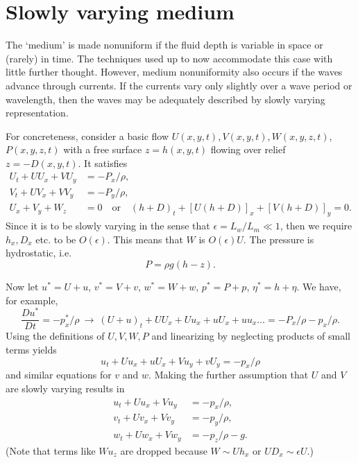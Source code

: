 \section{Slowly varying medium}

The `medium' is made nonuniform if the fluid depth is variable in space or (rarely) in
time. The techniques used up to now accommodate this case with little further thought.
However, medium nonuniformity also occurs if the waves advance through currents. If
the currents vary only slightly over a wave period or wavelength, then the waves may be
adequately described by slowly varying representation.

\sourcepagebreak

For concreteness, consider a basic flow $U(x,y,t),V(x,y,t),W(x,y,z,t)$,
$P(x,y,z,t)$ with a free surface $z=h(x,y,t)$ flowing over relief $z=-D(x,y,t)$. It
satisfies
\begin{align*}
	U_t+UU_x+VU_y & =-P_x/\rho, \\
	V_t+UV_x+VV_y & =-P_y/\rho, \\
	U_x+V_y+W_z   & =0
	\quad\text{or}\quad
	(h+D)_t+[U(h+D)]_x+[V(h+D)]_y=0.
\end{align*}
Since it is to be slowly varying in the sense that $\epsilon=L_w/L_m\ll1$, then we require
$h_x,D_x$ etc. to be $O(\epsilon)$. This means that $W$ is $O(\epsilon)U$. The pressure is hydrostatic, i.e.
\[
	P=\rho g(h-z).
\]

Now let $u^*=U+u$, $v^*=V+v$, $w^*=W+w$, $p^*=P+p$, $\eta^*=h+\eta$. We
have, for example,
\[
	\frac{Du^*}{Dt}=-p_x^*/\rho
	\ \longrightarrow\
	(U+u)_t+UU_x+Uu_x+uU_x+uu_x\ldots=-P_x/\rho-p_x/\rho.
\]
Using the definitions of $U,V,W,P$ and linearizing by neglecting products of small
terms yields
\[
	u_t+Uu_x+uU_x+Vu_y+vU_y=-p_x/\rho
\]
and similar equations for $v$ and $w$. Making the further assumption that $U$ and $V$ are
slowly varying results in
\begin{align*}
	u_t+Uu_x+Vu_y & =-p_x/\rho,   \\
	v_t+Uv_x+Vv_y & =-p_y/\rho,   \\
	w_t+Uw_x+Vw_y & =-p_z/\rho-g.
\end{align*}
(Note that terms like $Wu_z$ are dropped because $W\sim Uh_x$ or $UD_x\sim\epsilon U$.)

\sourcepagebreak

